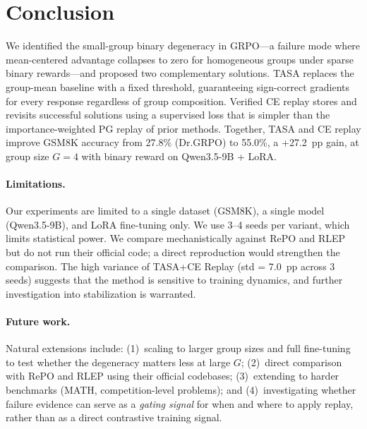 \section{Conclusion}
\label{sec:conclusion}

We identified the small-group binary degeneracy in GRPO---a failure mode where mean-centered advantage collapses to zero for homogeneous groups under sparse binary rewards---and proposed two complementary solutions.
TASA replaces the group-mean baseline with a fixed threshold, guaranteeing sign-correct gradients for every response regardless of group composition.
Verified CE replay stores and revisits successful solutions using a supervised loss that is simpler than the importance-weighted PG replay of prior methods.
Together, TASA and CE replay improve GSM8K accuracy from 27.8\% (Dr.GRPO) to 55.0\%, a +27.2~pp gain, at group size $G{=}4$ with binary reward on Qwen3.5-9B + LoRA.

\paragraph{Limitations.}
Our experiments are limited to a single dataset (GSM8K), a single model (Qwen3.5-9B), and LoRA fine-tuning only.
We use 3--4 seeds per variant, which limits statistical power.
We compare mechanistically against RePO and RLEP but do not run their official code; a direct reproduction would strengthen the comparison.
The high variance of TASA+CE Replay (std = 7.0~pp across 3 seeds) suggests that the method is sensitive to training dynamics, and further investigation into stabilization is warranted.

\paragraph{Future work.}
Natural extensions include: (1)~scaling to larger group sizes and full fine-tuning to test whether the degeneracy matters less at large $G$; (2)~direct comparison with RePO and RLEP using their official codebases; (3)~extending to harder benchmarks (MATH, competition-level problems); and (4)~investigating whether failure evidence can serve as a \emph{gating signal} for when and where to apply replay, rather than as a direct contrastive training signal.
